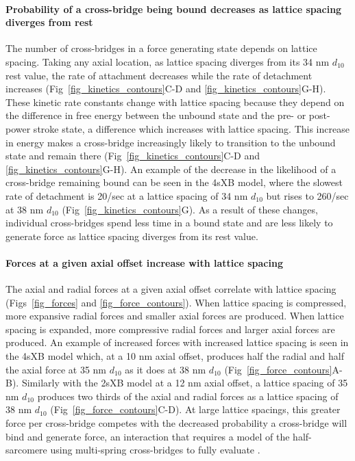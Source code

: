 \documentclass[10pt]{article}
\newcommand{\citep}[1]{\cite{#1}} %
\begin{document}
\paragraph{Probability of a cross-bridge being bound decreases as lattice spacing diverges from rest} %
The number of cross-bridges in a force generating state depends on lattice spacing. 
Taking any axial location, as lattice spacing diverges from its 34 nm $d_{10}$ rest value, the rate of attachment decreases while the rate of detachment increases (Fig~\ref{fig_kinetics_contours}C-D and \ref{fig_kinetics_contours}G-H). 
These kinetic rate constants change with lattice spacing because they depend on the difference in free energy between the unbound state and the pre- or post-power stroke state, a difference which increases with lattice spacing.
This increase in energy makes a cross-bridge increasingly likely to transition to the unbound state and remain there (Fig~\ref{fig_kinetics_contours}C-D and  \ref{fig_kinetics_contours}G-H). 
An example of the decrease in the likelihood of a cross-bridge remaining bound can be seen in the 4sXB model, where the slowest rate of detachment is 20/sec at a lattice spacing of 34 nm $d_{10}$ but rises to 260/sec at 38 nm $d_{10}$ (Fig~\ref{fig_kinetics_contours}G). 
As a result of these changes, individual cross-bridges spend less time in a bound state and are less likely to generate force as lattice spacing diverges from its rest value.

\paragraph{Forces at a given axial offset increase with lattice spacing} %
The axial and radial forces at a given axial offset correlate with lattice spacing (Figs~\ref{fig_forces} and \ref{fig_force_contours}).
When lattice spacing is compressed, more expansive radial forces and smaller axial forces are produced. 
When lattice spacing is expanded, more compressive radial forces and larger axial forces are produced. 
An example of increased forces with increased lattice spacing is seen in the 4sXB model which, at a 10 nm axial offset, produces half the radial and half the axial force at 35 nm $d_{10}$ as it does at 38 nm $d_{10}$ (Fig~\ref{fig_force_contours}A-B). 
Similarly with the 2sXB model at a 12 nm axial offset, a lattice spacing of 35 nm $d_{10}$ produces two thirds of the axial and radial forces as a lattice spacing of 38 nm $d_{10}$ (Fig~\ref{fig_force_contours}C-D).
At large lattice spacings, this greater force per cross-bridge competes with the decreased probability a cross-bridge will bind and generate force, an interaction that requires a model of the half-sarcomere using multi-spring cross-bridges to fully evaluate \citep{Martyn2004}. 
\end{document}
